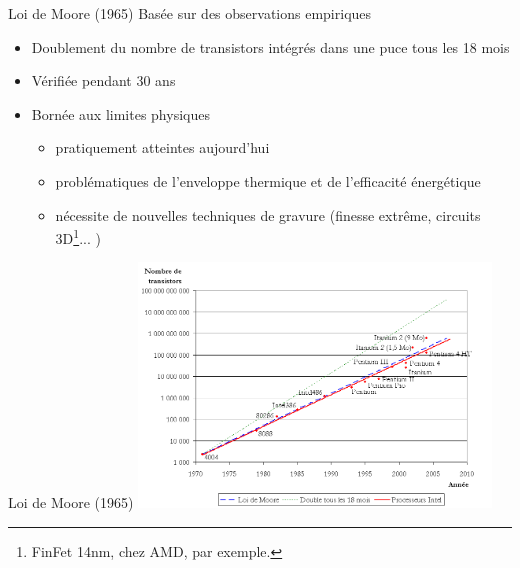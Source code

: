 \begin{frame}{Loi de Moore (1965)}
Basée sur des observations empiriques
\begin{itemize}
\item Doublement du nombre de transistors intégrés dans une puce tous les 18 mois
\item Vérifiée pendant 30 ans
\item Bornée aux limites physiques
\begin{itemize}
\item pratiquement atteintes aujourd'hui
\item problématiques de l'enveloppe thermique et de l'efficacité énergétique
\item nécessite de nouvelles techniques de gravure (finesse extrême, circuits 3D\footnote{FinFet 14nm, chez AMD, par exemple.}... )
\end{itemize}
\end{itemize}
\end{frame}


\begin{frame}{Loi de Moore (1965)}
\includegraphics[height=6.5cm]{../illustration/Evolutionprocesseurs.png}
\end{frame}


